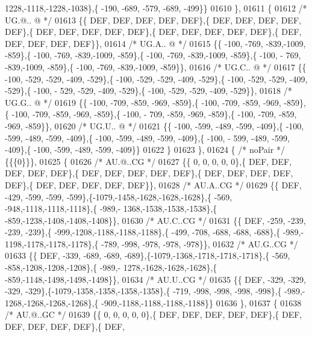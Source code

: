 \begin{DoxyCode}
      1228,-1118,-1228,-1038\},\{ -190, -689, -579, -689, -499\}\}
01610 \},
01611 \{
01612 \textcolor{comment}{/* UG.@.. @ */}
01613 \{\{  DEF,  DEF,  DEF,  DEF,  DEF\},\{  DEF,  DEF,  DEF,  DEF,  DEF\},\{  DEF,  DEF,  DEF,  DEF,  DEF\},\{  DEF,  
      DEF,  DEF,  DEF,  DEF\},\{  DEF,  DEF,  DEF,  DEF,  DEF\}\},
01614 \textcolor{comment}{/* UG.A.. @ */}
01615 \{\{ -100, -769, -839,-1009, -859\},\{ -100, -769, -839,-1009, -859\},\{ -100, -769, -839,-1009, -859\},\{ -100, -
      769, -839,-1009, -859\},\{ -100, -769, -839,-1009, -859\}\},
01616 \textcolor{comment}{/* UG.C.. @ */}
01617 \{\{ -100, -529, -529, -409, -529\},\{ -100, -529, -529, -409, -529\},\{ -100, -529, -529, -409, -529\},\{ -100, -
      529, -529, -409, -529\},\{ -100, -529, -529, -409, -529\}\},
01618 \textcolor{comment}{/* UG.G.. @ */}
01619 \{\{ -100, -709, -859, -969, -859\},\{ -100, -709, -859, -969, -859\},\{ -100, -709, -859, -969, -859\},\{ -100, -
      709, -859, -969, -859\},\{ -100, -709, -859, -969, -859\}\},
01620 \textcolor{comment}{/* UG.U.. @ */}
01621 \{\{ -100, -599, -489, -599, -409\},\{ -100, -599, -489, -599, -409\},\{ -100, -599, -489, -599, -409\},\{ -100, -
      599, -489, -599, -409\},\{ -100, -599, -489, -599, -409\}\}
01622 \}
01623 \},
01624 \{ \textcolor{comment}{/* noPair */} \{\{\{0\}\}\},
01625 \{
01626 \textcolor{comment}{/* AU.@..CG */}
01627 \{\{    0,    0,    0,    0,    0\},\{  DEF,  DEF,  DEF,  DEF,  DEF\},\{  DEF,  DEF,  DEF,  DEF,  DEF\},\{  DEF,  
      DEF,  DEF,  DEF,  DEF\},\{  DEF,  DEF,  DEF,  DEF,  DEF\}\},
01628 \textcolor{comment}{/* AU.A..CG */}
01629 \{\{  DEF, -429, -599, -599, -599\},\{-1079,-1458,-1628,-1628,-1628\},\{ -569, -948,-1118,-1118,-1118\},\{ -989,-
      1368,-1538,-1538,-1538\},\{ -859,-1238,-1408,-1408,-1408\}\},
01630 \textcolor{comment}{/* AU.C..CG */}
01631 \{\{  DEF, -259, -239, -239, -239\},\{ -999,-1208,-1188,-1188,-1188\},\{ -499, -708, -688, -688, -688\},\{ -989,-
      1198,-1178,-1178,-1178\},\{ -789, -998, -978, -978, -978\}\},
01632 \textcolor{comment}{/* AU.G..CG */}
01633 \{\{  DEF, -339, -689, -689, -689\},\{-1079,-1368,-1718,-1718,-1718\},\{ -569, -858,-1208,-1208,-1208\},\{ -989,-
      1278,-1628,-1628,-1628\},\{ -859,-1148,-1498,-1498,-1498\}\},
01634 \textcolor{comment}{/* AU.U..CG */}
01635 \{\{  DEF, -329, -329, -329, -329\},\{-1079,-1358,-1358,-1358,-1358\},\{ -719, -998, -998, -998, -998\},\{ -989,-
      1268,-1268,-1268,-1268\},\{ -909,-1188,-1188,-1188,-1188\}\}
01636 \},
01637 \{
01638 \textcolor{comment}{/* AU.@..GC */}
01639 \{\{    0,    0,    0,    0,    0\},\{  DEF,  DEF,  DEF,  DEF,  DEF\},\{  DEF,  DEF,  DEF,  DEF,  DEF\},\{  DEF,  

\end{DoxyCode}
